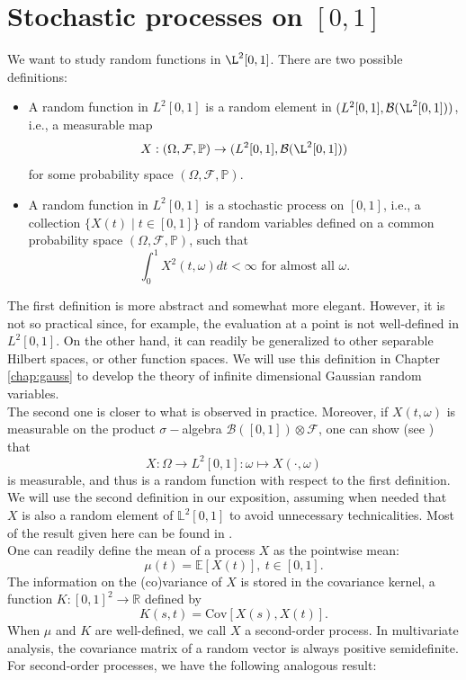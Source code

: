 \documentclass[10pt, a4paper]{report}
\newcommand{\E}[0]{\mathbb{E}}
\newcommand{\Ll}[0]{\mathbb{L}}
\newcommand{\R}[0]{\mathbb{R}}
\newcommand{\Pp}[0]{\mathbb{P}}
\newcommand{\F}[0]{\mathcal{F}}
\theoremstyle{definition}
\theoremstyle{remark}
\begin{document}
\section{Stochastic processes on $[0,1]$}
We want to study random functions in $\L^2[0,1]$. There are two possible definitions:
\begin{itemize}
	\item A random function in $L^2[0,1]$ is a random element in $(L^2[0,1],\mathcal{B}(\L^2[0,1]))$, i.e., a measurable map $$X:(\Omega,\mathcal{F},\Pp) \to (L^2[0,1],\mathcal{B}(\L^2[0,1]))$$
	for some probability space $(\Omega,\mathcal{F},\Pp)$.
	\item A random function in $L^2[0,1]$ is a stochastic process on $[0,1]$, i.e., a collection $\{X(t) \mid t\in [0,1] \}$ of random variables defined on a common probability space $(\Omega,\mathcal{F},\Pp)$, such that 
	$$\int_{0}^{1} X^2(t,\omega) dt < \infty \text{ for almost all } \omega.$$ 
\end{itemize}
The first definition is more abstract and somewhat more elegant. However, it is not so practical since, for example, the evaluation at a point is not well-defined in $L^2[0,1]$. On the other hand, it can readily be generalized to other separable Hilbert spaces, or other function spaces. We will use this definition in Chapter \ref{chap:gauss} to develop the theory of infinite dimensional Gaussian random variables.\\
The second one is closer to what is observed in practice. Moreover, if $X(t,\omega)$ is measurable on the product $\sigma-$algebra $\mathcal{B}([0,1]) \otimes \F$, one can show (see \cite[Theorem 7.4.1]{found}) that 
$$X: \Omega \to L^2[0,1]: \omega \mapsto X(\cdot,\omega)$$
is measurable, and thus is a random function with respect to the first definition.\\
We will use the second definition in our exposition, assuming when needed that $X$ is also a random element of $\Ll^2[0,1]$ to avoid unnecessary technicalities. Most of the result given here can be found in \cite{found}.\\
One can readily define the mean of a process $X$ as the pointwise mean:
$$\mu(t) = \E[X(t)], \ t \in [0,1].$$
The information on the (co)variance of $X$ is stored in the covariance kernel, a function $K:[0,1]^2 \to \R$ defined by 
$$K(s,t) = \mathrm{Cov}[X(s),X(t)].$$
When $\mu$ and $K$ are well-defined, we call $X$ a second-order process. In multivariate analysis, the covariance matrix of a random vector is always positive semidefinite. For second-order processes, we have the following analogous result:
\end{document}
